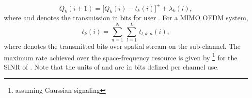 \begin{equation}
Q_k(i+1) = \Big [ Q_k(i) - t_k(i) \Big ]^+ + \lambda_k(i),
\label{eqn-2a}
\end{equation}
where  and  denotes the transmission in bits for user . For a \ac{MIMO} \ac{OFDM} system,
\begin{equation}
t_k(i) = \sum_{n = 1}^N \, \sum_{l = 1}^L \, t_{l,k,n}(i),
\end{equation}
where  denotes the transmitted bits over  spatial stream on the  sub-channel. The maximum rate achieved over the  space-frequency resource is given by \footnote{assuming Gaussian signaling} for the \ac{SINR} of . Note that the units of  and  are in bits defined per channel use.